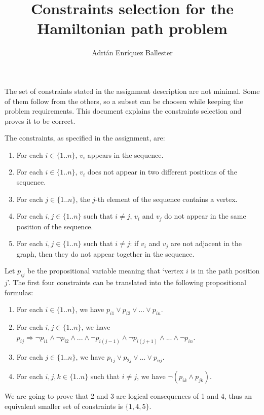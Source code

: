 \documentclass{article}
\title{Constraints selection for the Hamiltonian path problem}
\author{Adrián Enríquez Ballester}
\begin{document}
\maketitle

The set of constraints stated in the assignment description are not minimal.
Some of them follow from the others, so a subset can be choosen while keeping the
problem requirements. This document explains the constraints selection and
proves it to be correct.

The constraints, as specified in the assignment, are:

\begin{enumerate}
  \item For each $i \in \{1..n\}$, $v_i$ appears in the sequence.
  \item For each $i \in \{1..n\}$, $v_i$ does not appear in two different
    positions of the sequence.
  \item For each $j \in \{1..n\}$, the $j$-th element of the sequence contains
    a vertex.
  \item For each $i,j \in \{1..n\}$ such that $i \neq j$, $v_i$ and $v_j$ do
    not appear in the same position of the sequence.
  \item For each $i,j \in \{1..n\}$ such that $i \neq j$: if $v_i$ and $v_j$
    are not adjacent in the graph, then they do not appear together in the sequence.
\end{enumerate}

Let $p_{i j}$ be the propositional variable meaning that `vertex $i$ is in the
path position $j$'. The first four constraints can be translated into the following
propositional formulas:

\begin{enumerate}
  \item For each $i \in \{1..n\}$, we have $p_{i 1} \lor p_{i 2} \lor ... \lor
    p_{i n}$.
  \item For each $i,j \in \{1..n\}$, we have $p_{i j} \Rightarrow \neg p_{i 1}
    \land \neg p_{i 2} \land ... \land \neg p_{i (j - 1)} \land \neg p_{i (j
    + 1)} \land ... \land \neg p_{i n}$.
  \item For each $j \in \{1..n\}$, we have $p_{1 j} \lor p_{2 j} \lor ... \lor
    p_{n j}$.
  \item For each $i,j,k \in \{1..n\}$ such that $i \neq j$, we have $\neg (p_{i k}
    \land p_{j k})$.
\end{enumerate}

We are going to prove that 2 and 3 are logical consequences of 1 and 4, thus an
equivalent smaller set of constraints is $\{1,4,5\}$.
\end{document}
